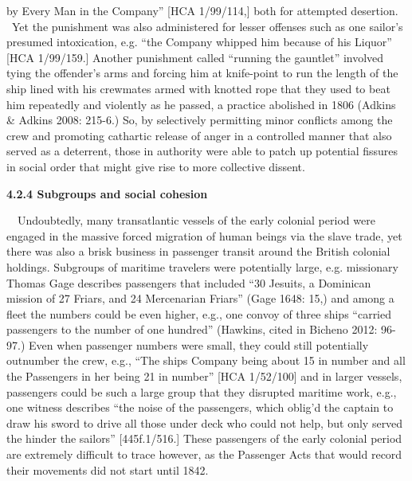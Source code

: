 \begin{styleStandard}
by Every Man in the Company” [HCA 1/99/114,] both for attempted desertion. \ Yet the punishment was also administered for lesser offenses such as one sailor’s presumed intoxication, e.g. “the Company whipped him because of his Liquor” [HCA 1/99/159.] Another punishment called “running the gauntlet” involved tying the offender’s arms and forcing him at knife-point to run the length of the ship lined with his crewmates armed with knotted rope that they used to beat him repeatedly and violently as he passed, a practice abolished in 1806 (Adkins \& Adkins 2008: 215-6.) So, by selectively permitting minor conflicts among the crew and promoting cathartic release of anger in a controlled manner that also served as a deterrent, those in authority were able to patch up potential fissures in social order that might give rise to more collective dissent. 
\end{styleStandard}

\begin{styleStandard}
\textbf{4.2.4 Subgroups and social cohesion}
\end{styleStandard}

\begin{styleStandard}
\ \ Undoubtedly, many transatlantic vessels of the early colonial period were engaged in the massive forced migration of human beings via the slave trade, yet there was also a brisk business in passenger transit around the British colonial holdings. Subgroups of maritime travelers were potentially large, e.g. missionary Thomas Gage describes passengers that included “30 Jesuits, a Dominican mission of 27 Friars, and 24 Mercenarian Friars” (Gage 1648: 15,) and among a fleet the numbers could be even higher, e.g., one convoy of three ships “carried passengers to the number of one hundred” (Hawkins, cited in Bicheno 2012: 96-97.) Even when passenger numbers were small, they could still potentially outnumber the crew, e.g., “The ships Company being about 15 in number and all the Passengers in her being 21 in number” [HCA 1/52/100] and in larger vessels, passengers could be such a large group that they disrupted maritime work, e.g., one witness describes “the noise of the passengers, which oblig’d the captain to draw his sword to drive all those under deck who could not help, but only served the hinder the sailors” [445f.1/516.] These passengers of the early colonial period are extremely difficult to trace however, as the Passenger Acts that would record their movements did not start until 1842.
\end{styleStandard}


